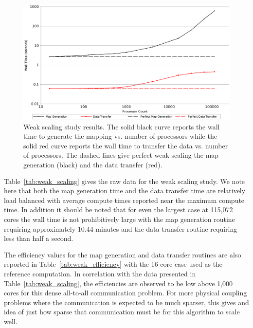 \documentclass{mc2013}
\begin{document}
\begin{figure}[ht!]
  \centering \includegraphics[width=5.5in]{WeakScaling.png}
  \caption{Weak scaling study results. The solid black curve reports
    the wall time to generate the mapping vs. number of processors
    while the solid red curve reports the wall time to transfer the
    data vs. number of processors. The dashed lines give perfect weak
    scaling the map generation (black) and the data transfer (red).}
  \label{fig:weak_scaling}
\end{figure}

Table~\ref{tab:weak_scaling} gives the raw data for the weak scaling
study. We note here that both the map generation time and the data
transfer time are relatively load balanced with average compute times
reported near the maximum compute time. In addition it should be noted
that for even the largest case at 115,072 cores the wall time is not
prohibitively large with the map generation routine requiring
approximately 10.44 minutes and the data transfer routine requiring
less than half a second.

The efficiency values for the map generation and data transfer
routines are also reported in Table~\ref{tab:weak_efficiency} with the
16 core case used as the reference computation. In correlation with
the data presented in Table~\ref{tab:weak_scaling}, the efficiencies
are observed to be low above 1,000 cores for this dense all-to-all
communication problem. For more physical coupling problems where the
communication is expected to be much sparser, this gives and idea of
just how sparse that communication must be for this algorithm to scale
well.
\end{document}
